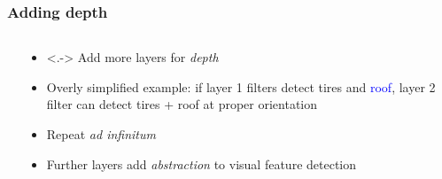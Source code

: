 \begin{frame}
    \frametitle{Adding depth}

    \begin{columns}
        \begin{column}{0.32\textwidth}
            
        \end{column}

        \begin{column}{0.68\textwidth}
            \begin{itemize}
                \item<.-> Add more layers for \emph{depth}
                \item<+-> Overly simplified example: if layer 1 filters detect \textcolor{Green4}{tires} and \textcolor{blue}{roof}, \alert{layer 2 filter} can detect tires + roof at proper orientation
                \item<6-> Repeat \emph{ad infinitum}
                \item<6-> Further layers add \emph{abstraction} to visual feature detection
            \end{itemize}
        \end{column}
    \end{columns}
\end{frame}

